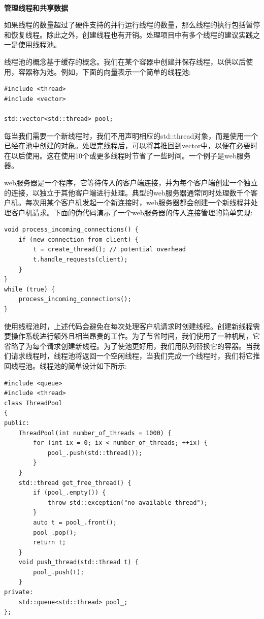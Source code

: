 \noindent\textbf{}\ \par
\textbf{管理线程和共享数据} \ \par
如果线程的数量超过了硬件支持的并行运行线程的数量，那么线程的执行包括暂停和恢复线程。除此之外，创建线程也有开销。处理项目中有多个线程的建议实践之一是使用线程池。 \par
线程池的概念基于缓存的概念。我们在某个容器中创建并保存线程，以供以后使用，容器称为池。例如，下面的向量表示一个简单的线程池: \par

\begin{lstlisting}[caption={}]
#include <thread>
#include <vector>

std::vector<std::thread> pool;
\end{lstlisting}

每当我们需要一个新线程时，我们不用声明相应的std::thread对象，而是使用一个已经在池中创建的对象。处理完线程后，可以将其推回到vector中，以便在必要时在以后使用。这在使用10个或更多线程时节省了一些时间。一个例子是web服务器。 \par
web服务器是一个程序，它等待传入的客户端连接，并为每个客户端创建一个独立的连接，以独立于其他客户端进行处理。典型的web服务器通常同时处理数千个客户机。每次用某个客户机发起一个新连接时，web服务器都会创建一个新线程并处理客户机请求。下面的伪代码演示了一个web服务器的传入连接管理的简单实现: \par

\begin{lstlisting}[caption={}]
void process_incoming_connections() {
	if (new connection from client) {
		t = create_thread(); // potential overhead
		t.handle_requests(client);
	}
}
while (true) {
	process_incoming_connections();
}
\end{lstlisting}

使用线程池时，上述代码会避免在每次处理客户机请求时创建线程。创建新线程需要操作系统进行额外且相当昂贵的工作。为了节省时间，我们使用了一种机制，它省略了为每个请求创建新线程。为了使池更好用，我们用队列替换它的容器。当我们请求线程时，线程池将返回一个空闲线程，当我们完成一个线程时，我们将它推回线程池。线程池的简单设计如下所示: \par

\begin{lstlisting}[caption={}]
#include <queue>
#include <thread>
class ThreadPool
{
public:
	ThreadPool(int number_of_threads = 1000) {
		for (int ix = 0; ix < number_of_threads; ++ix) {
			pool_.push(std::thread());
		}
	}
	std::thread get_free_thread() {
		if (pool_.empty()) {
			throw std::exception("no available thread");
		}
		auto t = pool_.front();
		pool_.pop();
		return t;
	}
	void push_thread(std::thread t) {
		pool_.push(t);
	}
private:
	std::queue<std::thread> pool_;
};
\end{lstlisting}

